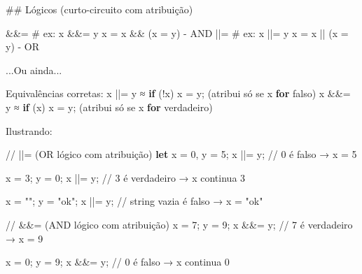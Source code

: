 \documentclass[
  portuguese,
  letterpaper,
  DIV=11,
  numbers=noendperiod]{scrreprt}
\newenvironment{Shaded}{\begin{snugshade}}{\end{snugshade}}
\newcommand{\CommentTok}[1]{\textcolor[rgb]{0.37,0.37,0.37}{#1}}
\newcommand{\ControlFlowTok}[1]{\textcolor[rgb]{0.00,0.23,0.31}{\textbf{#1}}}
\newcommand{\DecValTok}[1]{\textcolor[rgb]{0.68,0.00,0.00}{#1}}
\newcommand{\FunctionTok}[1]{\textcolor[rgb]{0.28,0.35,0.67}{#1}}
\newcommand{\KeywordTok}[1]{\textcolor[rgb]{0.00,0.23,0.31}{\textbf{#1}}}
\newcommand{\NormalTok}[1]{\textcolor[rgb]{0.00,0.23,0.31}{#1}}
\newcommand{\OperatorTok}[1]{\textcolor[rgb]{0.37,0.37,0.37}{#1}}
\newcommand{\StringTok}[1]{\textcolor[rgb]{0.13,0.47,0.30}{#1}}
\begin{document}
\hfill\break

\begin{Shaded}
\begin{Highlighting}[]
\NormalTok{\#\# }\FunctionTok{Lógicos}\NormalTok{ (curto}\OperatorTok{{-}}\NormalTok{circuito com atribuição)}


\OperatorTok{\&\&=}\NormalTok{  \# ex}\OperatorTok{:}\NormalTok{  x }\OperatorTok{\&\&=}\NormalTok{ y     x }\OperatorTok{=}\NormalTok{ x }\OperatorTok{\&\&}\NormalTok{ (x }\OperatorTok{=}\NormalTok{ y) }\OperatorTok{{-}}\NormalTok{ AND}
\OperatorTok{||=}\NormalTok{  \# ex}\OperatorTok{:}\NormalTok{ x }\OperatorTok{||=}\NormalTok{ y  x }\OperatorTok{=}\NormalTok{ x }\OperatorTok{||}\NormalTok{ (x }\OperatorTok{=}\NormalTok{ y) }\OperatorTok{{-}}\NormalTok{ OR}

\OperatorTok{...}\NormalTok{Ou ainda}\OperatorTok{...}

\NormalTok{Equivalências corretas}\OperatorTok{:}
\NormalTok{x }\OperatorTok{||=}\NormalTok{ y ≈ }\ControlFlowTok{if}\NormalTok{ (}\OperatorTok{!}\NormalTok{x) x }\OperatorTok{=}\NormalTok{ y}\OperatorTok{;}\NormalTok{ (atribui só se x }\ControlFlowTok{for}\NormalTok{ falso)}
\NormalTok{x }\OperatorTok{\&\&=}\NormalTok{ y ≈ }\ControlFlowTok{if}\NormalTok{ (x) x }\OperatorTok{=}\NormalTok{ y}\OperatorTok{;}\NormalTok{ (atribui só se x }\ControlFlowTok{for}\NormalTok{ verdadeiro)}

\NormalTok{    Ilustrando}\OperatorTok{:}

\CommentTok{// ||=  (OR lógico com atribuição)}
\KeywordTok{let}\NormalTok{ x }\OperatorTok{=} \DecValTok{0}\OperatorTok{,}\NormalTok{ y }\OperatorTok{=} \DecValTok{5}\OperatorTok{;}
\NormalTok{x }\OperatorTok{||=}\NormalTok{ y}\OperatorTok{;}         \CommentTok{// 0 é falso → x = 5}

\NormalTok{x }\OperatorTok{=} \DecValTok{3}\OperatorTok{;}\NormalTok{ y }\OperatorTok{=} \DecValTok{0}\OperatorTok{;}
\NormalTok{x }\OperatorTok{||=}\NormalTok{ y}\OperatorTok{;}         \CommentTok{// 3 é verdadeiro → x continua 3}

\NormalTok{x }\OperatorTok{=} \StringTok{""}\OperatorTok{;}\NormalTok{ y }\OperatorTok{=} \StringTok{"ok"}\OperatorTok{;}
\NormalTok{x }\OperatorTok{||=}\NormalTok{ y}\OperatorTok{;}         \CommentTok{// string vazia é falso → x = "ok"}

\CommentTok{// \&\&=  (AND lógico com atribuição)}
\NormalTok{x }\OperatorTok{=} \DecValTok{7}\OperatorTok{;}\NormalTok{ y }\OperatorTok{=} \DecValTok{9}\OperatorTok{;}
\NormalTok{x }\OperatorTok{\&\&=}\NormalTok{ y}\OperatorTok{;}         \CommentTok{// 7 é verdadeiro → x = 9}

\NormalTok{x }\OperatorTok{=} \DecValTok{0}\OperatorTok{;}\NormalTok{ y }\OperatorTok{=} \DecValTok{9}\OperatorTok{;}
\NormalTok{x }\OperatorTok{\&\&=}\NormalTok{ y}\OperatorTok{;}         \CommentTok{// 0 é falso → x continua 0}
\end{Highlighting}
\end{Shaded}
\end{document}

